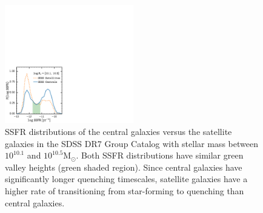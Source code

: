\documentclass[iop,apj,tighten,twocolappendix,numberedappendix]{emulateapj}
\begin{document}
\begin{figure}
\begin{center}
\includegraphics[width=0.5\textwidth]{figs/SSFR_SDSS.pdf}
\caption{SSFR distributions of the central galaxies
versus the satellite galaxies in the SDSS DR7 Group Catalog with
stellar mass between $10^{10.1}$ and $10^{10.5}\mathrm{M}_\odot$. 
Both SSFR distributions have similar green valley heights 
(green shaded region). Since
central galaxies have significantly longer quenching timescales, 
satellite galaxies have a higher rate of transitioning from 
star-forming to quenching than central galaxies.}
\label{fig:sdss_censat_ssfr}
\end{center}
\end{figure}

\end{document}
